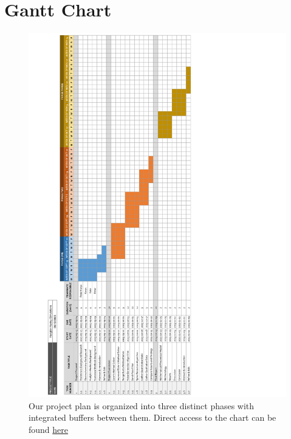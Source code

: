 \documentclass{article} %
\begin{document}
\begin{multicols}{2}
\label{last_page}

\newpage



\end{multicols}

\newpage
\appendix

\section{Gantt Chart}
\label{app:a_gantt_chart}
\begin{figure}[htbp]
  \centering
  \includegraphics[width=0.88\linewidth]{Figs/gantt_chart_rot.png}
    \caption{Our project plan is organized into three distinct phases with integrated buffers between them.
            Direct access to the chart can be found \href{https://docs.google.com/spreadsheets/d/1jHzTcHqw4nSWZ5ZlPa9hzeYbwHf0eZ49koE-SQ0onvM/edit?usp=sharing}{here}}
\end{figure}

\newpage
\end{document}
